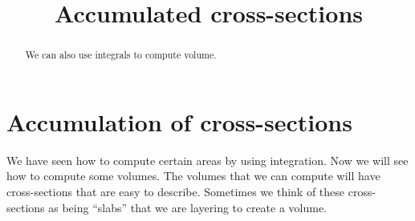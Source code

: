 \documentclass{ximera}
\title[Dig-In:]{Accumulated cross-sections}
\begin{document}
\begin{abstract}
  We can also use integrals to compute volume.
\end{abstract}
\maketitle

\section{Accumulation of cross-sections}

We have seen how to compute certain areas by using integration. Now we
will see how to compute some volumes.  The volumes that we can compute
will have cross-sections that are easy to describe. Sometimes we think
of these cross-sections as being ``slabs'' that we are layering to
create a volume.
\end{document}
